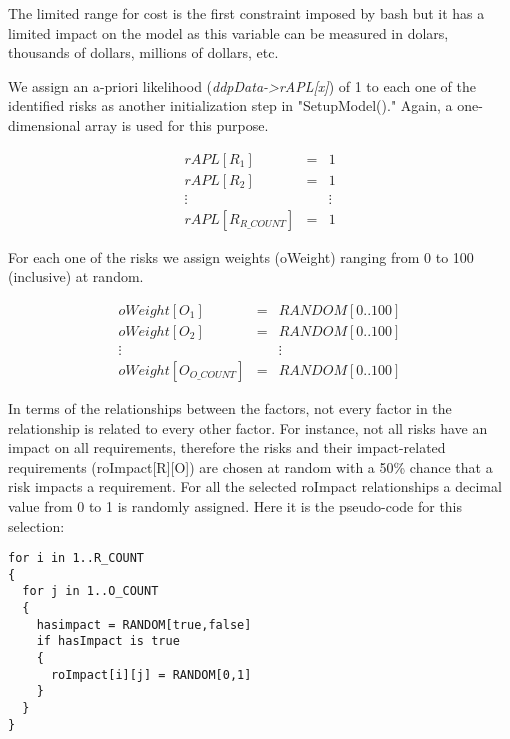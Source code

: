 The limited range for cost is the first constraint imposed by bash but it has a
limited impact on the model as this variable can be measured in dolars, thousands
of dollars, millions of dollars, etc.

We assign an a-priori likelihood (\textit{ddpData->rAPL[x]}) of 1 to each one of the
identified risks
as another initialization step in "SetupModel()." Again, a one-dimensional
array is used for this purpose.

\begin{footnotesize}\begin{eqnarray*}
rAPL[R_1] &=& 1 \\
rAPL[R_2] &=& 1 \\
\vdots & & \vdots \\
rAPL[R_{R\_COUNT}] &=& 1
\end{eqnarray*}\end{footnotesize}

For each one of the risks we assign weights (oWeight) ranging from 0 to 100
(inclusive) at random.

\begin{footnotesize}\begin{eqnarray*}
oWeight[O_1] &=& RANDOM[0..100] \\
oWeight[O_2] &=& RANDOM[0..100] \\
\vdots & & \vdots \\
oWeight[O_{O\_COUNT}] &=& RANDOM[0..100]
\end{eqnarray*}\end{footnotesize}

In terms of the relationships between the factors, not every factor in the
relationship is related to every other factor. For instance, not all risks have
an impact on all requirements, therefore the risks and their impact-related
requirements (roImpact[R][O]) are chosen at random with a 50\% chance that a
risk impacts a requirement. For all the selected roImpact relationships a
decimal value from 0 to 1 is randomly assigned. Here it is the pseudo-code for
this selection:

\begin{footnotesize}
\begin{verbatim}
for i in 1..R_COUNT 
{
  for j in 1..O_COUNT
  {
    hasimpact = RANDOM[true,false]
    if hasImpact is true
    {
      roImpact[i][j] = RANDOM[0,1]
    }
  }
}
\end{verbatim}
\end{footnotesize}

